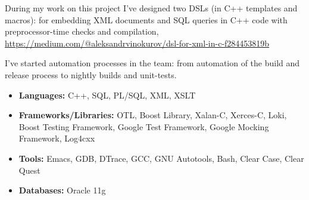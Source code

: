 During my work on this project I've designed two DSLs (in C++
templates and macros): for embedding XML documents and SQL queries in
C++ code with preprocessor-time checks and compilation,
\href{https://medium.com/@aleksandrvinokurov/dsl-for-xml-in-c-f284453819b}{\url{https://medium.com/@aleksandrvinokurov/dsl-for-xml-in-c-f284453819b}}

I've started automation processes in the team: from automation of the
build and release process to nightly builds and unit-tests.

\begin{itemize}[noitemsep, nosep]
  \item \textbf{Languages:} C++, SQL, PL/SQL, XML, XSLT
  \item \textbf{Frameworks/Libraries:} OTL, Boost Library, Xalan-C,
Xerces-C, Loki, Boost Testing Framework, Google Test Framework, Google
Mocking Framework, Log4cxx
  \item \textbf{Tools:} Emacs, GDB, DTrace, GCC, GNU Autotools, Bash,
Clear Case, Clear Quest
  \item \textbf{Databases:} Oracle 11g
\end{itemize}
